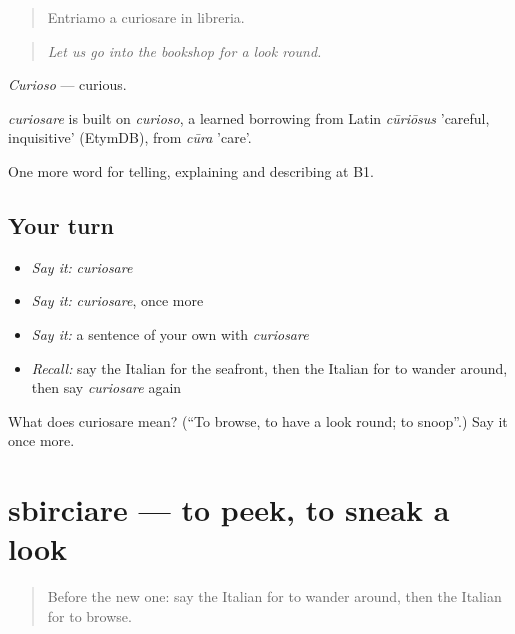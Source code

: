 \begin{quote}
Entriamo a curiosare in libreria.
\end{quote}

\begin{quote}
\emph{Let us go into the bookshop for a look round.}
\end{quote}

\emph{Curioso} — curious.

\begin{cousinweb}
\emph{curiosare} is built on \emph{curioso}, a learned borrowing from Latin \emph{cūriōsus} 'careful, inquisitive' (EtymDB), from \emph{cūra} 'care'.
\end{cousinweb}

\begin{grammarlens}[title={What you've built}]
One more word for telling, explaining and describing at B1.
\end{grammarlens}

\subsection*{Your turn}
\begin{itemize}
\raggedright
  \item \emph{Say it:} \emph{curiosare}
  \item \emph{Say it:} \emph{curiosare}, once more
  \item \emph{Say it:} a sentence of your own with \emph{curiosare}
  \item \emph{Recall:} say the Italian for the seafront, then the Italian for to wander around, then say \emph{curiosare} again
\end{itemize}

\begin{tcolorbox}[breakable,colback=teal!4,colframe=teal!35!black,title={Before you move on}]
What does curiosare mean? (\textquotedblleft{}To browse, to have a look round; to snoop\textquotedblright{}.) Say it once more.
\end{tcolorbox}
\section[sbirciare]{sbirciare — to peek, to sneak a look}

\label{lesson:IT-C451-sbirciare}



\begin{quote}
Before the new one: say the Italian for to wander around, then the Italian for to browse.
\end{quote}

